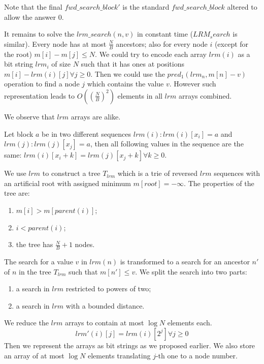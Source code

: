 Note that the final $fwd\_search\_block'$ is the standard $fwd\_search\_block$ altered to allow the answer $0$.

\bigskip

It remains to solve the $lrm\_search(n, v)$ in constant time ($LRM_search$ is similar).
Every node has at most $\frac{N}{B}$ ancestors; also for every node $i$ (except for the root) $m[i] - m[j] \le N$.
We could try to encode each array $lrm(i)$ as a bit string $lrm_i$ of size $N$ such that it has ones at positions $m[i] - lrm(i)[j] \forall j \ge 0$.
Then we could use the $pred_1(lrm_n, m[n] - v)$ operation to find a node $j$ which contains the value $v$.
However such representation leads to $O\left(\left(\frac{N}{B}\right)^2\right)$ elements in all $lrm$ arrays combined.

We observe that $lrm$ arrays are alike.
\begin{lemma}
	Let block $a$ be in two different sequences $lrm(i): lrm(i)[x_i] = a$ and $lrm(j): lrm(j)[x_j] = a$, then all following values in the sequence are the same: $lrm(i)[x_i+k] = lrm(j)[x_j+k] \forall k \ge 0$.
\end{lemma}

\label{Tlrm}
We use $lrm$ to construct a tree $T_{lrm}$ which is a trie of reversed $lrm$ sequences with an artificial root with assigned minimum $m[root] = -\infty$.
The properties of the tree are:
\begin{enumerate}
	\item $m[i] > m[parent(i)]$;
	\item $i < parent(i)$;
	\item the tree has $\frac{N}{B} + 1$ nodes.
\end{enumerate}

The search for a value $v$ in $lrm(n)$ is transformed to a search for an ancestor $n'$ of $n$ in the tree $T_{lrm}$ such that $m[n'] \le v$.
We split the search into two parts:
\begin{enumerate}
	\item a search in $lrm$ restricted to powers of two;
	\item a search in $lrm$ with a bounded distance.
\end{enumerate}

We reduce the $lrm$ arrays to contain at most $\log N$ elements each.
$$lrm'(i)[j] = lrm(i)[2^j] \forall j \ge 0$$
Then we represent the arrays as bit strings as we proposed earlier.
We also store an array of at most $\log N$ elements translating $j$-th one to a node number.

